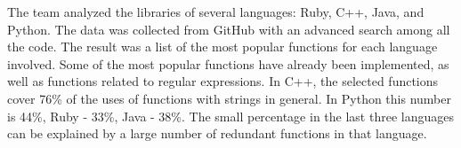 \documentclass[11pt,nonacm,natbib=false]{acmart}
\begin{document}
The team analyzed the libraries of several languages: Ruby, C++, Java, and Python. The data was collected from GitHub with an advanced search among all the code. The result was a list of the most popular functions for each language involved. Some of the most popular functions have already been implemented, as well as functions related to regular expressions. In C++, the selected functions cover 76\% of the uses of functions with strings in general. In Python this number is 44\%, Ruby - 33\%, Java - 38\%. The small percentage in the last three languages can be explained by a large number of redundant functions in that language.
\end{document}
